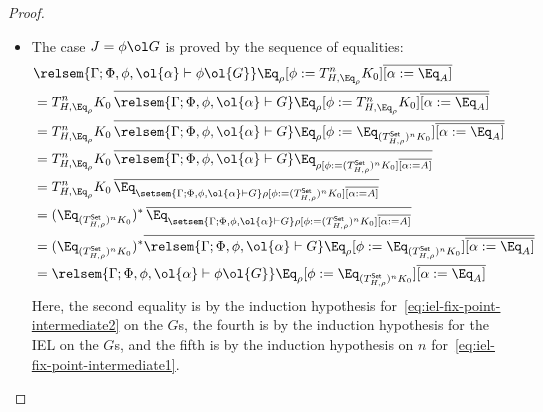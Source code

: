 \documentclass[acmsmall,review,anonymous]{acmart}
\theoremstyle{definition}
\newcommand{\set}{\mathsf{Set}}
\begin{document}
\begin{proof}
\begin{itemize}
\begin{itemize}
\item 
  The case $J = \phi \ol G$ is proved by the sequence of equalities:
\[
\begin{split}
& \relsem{\Gamma; \Phi, \phi, \ol{\alpha} \vdash \phi
    \ol{G}} \Eq_{\rho} [\phi := T^{n}_{H,\Eq_{\rho}} K_0]
  \overline{[\alpha := \Eq_A]}
  \\
&= T^{n}_{H,\Eq_{\rho}} K_0\, \overline{\relsem{\Gamma; \Phi,
      \phi, \ol{\alpha} \vdash G} \Eq_{\rho} [\phi :=
      T^{n}_{H,\Eq_{\rho}} K_0] \overline{[\alpha :=
        \Eq_A]}} \\ 
&= T^{n}_{H,\Eq_{\rho}} K_0\, \overline{\relsem{\Gamma; \Phi,
      \phi, \ol{\alpha} \vdash G} \Eq_{\rho} [\phi :=
      \Eq_{(T^\set_{H,\rho})^{n} K_0}] \overline{[\alpha :=
        \Eq_A]}} \\ 
&= T^{n}_{H,\Eq_{\rho}} K_0\, \overline{\relsem{\Gamma; \Phi,
      \phi, \ol{\alpha} \vdash G} \Eq_{\rho [\phi := (T^\set_{H,\rho})^{n}
        K_0] \overline{[\alpha := A]}}} \\ 
&= T^{n}_{H,\Eq_{\rho}} K_0\, \overline{\Eq_{\setsem{\Gamma;
        \Phi, \phi, \ol{\alpha} \vdash G} \rho [\phi :=
        (T^\set_{H,\rho})^{n} K_0] \overline{[\alpha :=
          A]}}} \\ 
&= (\Eq_{(T^\set_{H,\rho})^{n} K_0})^* \,\overline{\Eq_{\setsem{\Gamma;
        \Phi, \phi, \ol{\alpha} \vdash G} \rho [\phi :=
        (T^\set_{H,\rho})^{n} K_0] \overline{[\alpha :=
          A]}}} \\ 
&= (\Eq_{(T^\set_{H,\rho})^{n} K_0})^* \overline{\relsem{\Gamma;
      \Phi, \phi, \ol{\alpha} \vdash G} \Eq_{\rho} [\phi :=
      \Eq_{(T^\set_{H,\rho})^{n} K_0}] \overline{[\alpha :=
        \Eq_A]}} \\ 
&= \relsem{\Gamma; \Phi, \phi, \ol{\alpha} \vdash \phi \ol{G}}
  \Eq_{\rho} [\phi := \Eq_{(T^\set_{H,\rho})^{n} K_0}]
  \overline{[\alpha := \Eq_A]} 
\end{split}
\]
Here, the second equality is by the induction hypothesis
for~\eqref{eq:iel-fix-point-intermediate2} on the $G$s, the fourth is
by the induction hypothesis for the IEL on the $G$s, and the fifth is
by the induction hypothesis on $n$
for~\eqref{eq:iel-fix-point-intermediate1}.


\end{itemize}
\end{itemize}
\end{proof}
\end{document}
